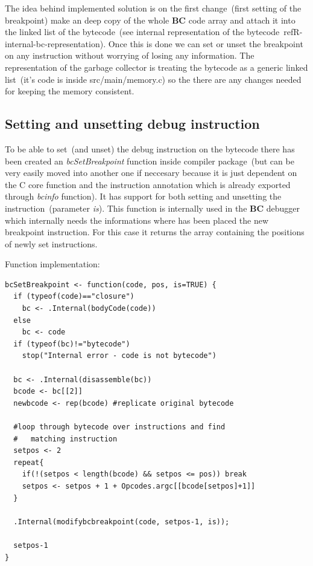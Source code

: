 \documentclass[thesis=M,english]{FITthesis}[2018/10/20]
\begin{document}
The idea behind implemented solution is on the first change~(first setting of the breakpoint) make an deep copy of the whole \textbf{BC} code array and attach it into the linked list of the bytecode~(see internal representation of the bytecode~ref{R-internal-bc-representation}). Once this is done we can set or unset the breakpoint on any instruction without worrying of losing any information. The representation of the garbage collector is treating the bytecode as a generic linked list~(it's code is inside src/main/memory.c) so the there are any changes needed for keeping the memory consistent.

\subsection{Setting and unsetting debug instruction}\label{setting-and-unsetting-debug-instruction}

To be able to set~(and unset) the debug instruction on the bytecode there has been created an \textit{bcSetBreakpoint} function inside compiler package~(but can be very easily moved into another one if neccesary because it is just dependent on the C core function and the instruction annotation which is already exported through \textit{bcinfo} function). It has support for both setting and unsetting the instruction~(parameter \textit{is}). This function is internally used in the \textbf{BC} debugger which internally needs the informations where has been placed the new breakpoint instruction. For this case it returns the array containing the positions of newly set instructions. 

Function implementation:
\begin{lstlisting}
bcSetBreakpoint <- function(code, pos, is=TRUE) {
  if (typeof(code)=="closure")
    bc <- .Internal(bodyCode(code))
  else
    bc <- code
  if (typeof(bc)!="bytecode") 
    stop("Internal error - code is not bytecode")

  bc <- .Internal(disassemble(bc))
  bcode <- bc[[2]]
  newbcode <- rep(bcode) #replicate original bytecode

  #loop through bytecode over instructions and find 
  #   matching instruction
  setpos <- 2
  repeat{
    if(!(setpos < length(bcode) && setpos <= pos)) break
    setpos <- setpos + 1 + Opcodes.argc[[bcode[setpos]+1]]
  }

  .Internal(modifybcbreakpoint(code, setpos-1, is));

  setpos-1
}
\end{lstlisting}
\end{document}
